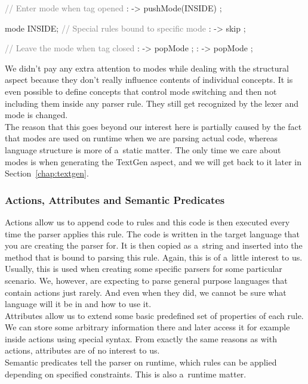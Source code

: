 \begin{antlr}
	\textcolor{gray}{// Enter mode when tag opened}
	        :   \literal{<}       -> pushMode(INSIDE) ;

	mode INSIDE;
	\textcolor{gray}{// Special rules bound to specific mode}
	           :    -> skip ;

	\textcolor{gray}{// Leave the mode when tag closed}
	       :   \literal{>}       -> popMode ;
	 :   \literal{/>}      -> popMode ;
\end{antlr}

We didn't pay any extra attention to modes while dealing with the structural aspect because they don't really influence contents of individual concepts.
It is even possible to define concepts that control mode switching and then not including them inside any parser rule.
They still get recognized by the lexer and mode is changed.
\\

The reason that this goes beyond our interest here is partially caused by the fact that modes are used on runtime when we are parsing actual code, whereas language structure is more of a~static matter.
The only time we care about modes is when generating the TextGen aspect, and we will get back to it later in Section~\ref{chap:textgen}.

\subsubsection{Actions, Attributes and Semantic Predicates}

Actions allow us to append code to rules and this code is then executed every time the parser applies this rule.
The code is written in the target language that you are creating the parser for.
It is then copied as a~string and inserted into the method that is bound to parsing this rule.
Again, this is of a~little interest to us.
Usually, this is used when creating some specific parsers for some particular scenario.
We, however, are expecting to parse general purpose languages that contain actions just rarely.
And even when they did, we cannot be sure what language will it be in and how to use it.
\\

Attributes allow us to extend some basic predefined set of properties of each rule.
We can store some arbitrary information there and later access it for example inside actions using special syntax.
From exactly the same reasons as with actions, attributes are of no interest to us.
\\

Semantic predicates tell the parser on runtime, which rules can be applied depending on specified constraints.
This is also a~runtime matter.
